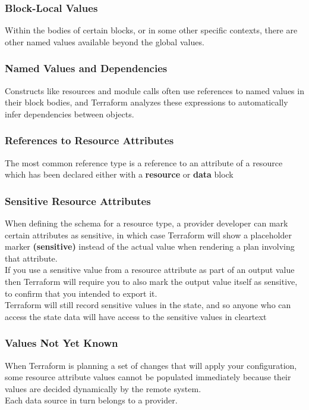 \documentclass[12pt, letterpaper, twoside]{article}
\begin{document}
\subsubsection{Block-Local Values}
Within the bodies of certain blocks, or in some other specific contexts, there are other named values available 
beyond the global values.\\

\subsubsection{Named Values and Dependencies}
Constructs like resources and module calls often use references to named values in their block bodies, and 
Terraform analyzes these expressions to automatically infer dependencies between objects.

\subsubsection{References to Resource Attributes}
The most common reference type is a reference to an attribute of a resource which has been declared either 
with a \textbf{resource} or \textbf{data} block

\subsubsection{Sensitive Resource Attributes}
When defining the schema for a resource type, a provider developer can mark certain attributes as sensitive, 
in which case Terraform will show a placeholder marker \textbf{(sensitive)} instead of the actual value when 
rendering a plan involving that attribute.\\

If you use a sensitive value from a resource attribute as part of an output value then Terraform will require 
you to also mark the output value itself as sensitive, to confirm that you intended to export it.\\

Terraform will still record sensitive values in the state, and so anyone who can access the state data will have 
access to the sensitive values in cleartext

\subsubsection{Values Not Yet Known}
When Terraform is planning a set of changes that will apply your configuration, some resource attribute values 
cannot be populated immediately because their values are decided dynamically by the remote system.\\
Each data source in turn belongs to a provider.\\
\end{document}
